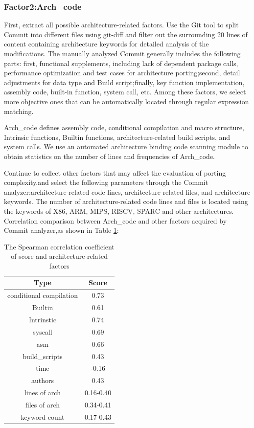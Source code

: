 \documentclass[sigconf,screen,review]{acmart}
\begin{document}
\subsubsection{Factor2:Arch\_code}

First, extract all possible architecture-related factors.
Use the Git tool to split Commit into different files using git-diff and filter out the surrounding 20 lines of content containing architecture keywords for detailed analysis of the modifications.
The manually analyzed Commit generally includes the following parts: first, functional supplements, including lack of dependent package calls, performance optimization and test cases for architecture porting;second, detail adjustments for data type and Build script;finally, key function implementation, assembly code, built-in function, system call, etc.
Among these factors, we select more objective ones that can be automatically located through regular expression matching.

Arch\_code defines assembly code, conditional compilation and macro structure, Intrinsic functions, Builtin functions, architecture-related build scripts, and system calls.
We use an automated architecture binding code scanning module to obtain statistics on the number of lines and frequencies of Arch\_code.

Continue to collect other factors that may affect the evaluation of porting complexity,and select the following parameters through the Commit analyzer:architecture-related code lines, architecture-related files, and architecture keywords.
The number of architecture-related code lines and files is located using the keywords of X86, ARM, MIPS, RISCV, SPARC and other architectures.
Correlation comparison between Arch\_code and other factors acquired by Commit analyzer,as shown in Table \ref{tab:score}:

\begin{table}
  \caption{The Spearman correlation coefficient of score and architecture-related factors}
  \label{tab:score}
  \begin{tabular}{cc}
    \toprule
    Type & Score \\
    \midrule
    conditional compilation & 0.73 \\
    Builtin & 0.61 \\
    Intrinstic & 0.74 \\
    syscall & 0.69 \\
    asm & 0.66 \\
    build\_scripts & 0.43 \\
    time & -0.16 \\
    authors & 0.43 \\
    lines of arch & 0.16-0.40 \\
    files of arch & 0.34-0.41 \\
    keyword count & 0.17-0.43 \\
    \bottomrule
  \end{tabular}
\end{table}
\end{document}
